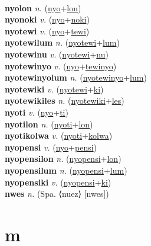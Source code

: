  \label{nyoaw} \\
\textbf{nyolon} \textit{n.} (\hyperref[nyo]{nyo}+\hyperref[lon]{lon})
 \label{nyolon} \\
\textbf{nyonoki} \textit{v.} (\hyperref[nyo]{nyo}+\hyperref[noki]{noki})
 \label{nyonoki} \\
\textbf{nyotewi} \textit{v.} (\hyperref[nyo]{nyo}+\hyperref[tewi]{tewi})
 \label{nyotewi} \\
\textbf{nyotewilum} \textit{n.} (\hyperref[nyotewi]{nyotewi}+\hyperref[lum]{lum})
 \label{nyotewilum} \\
\textbf{nyotewinu} \textit{v.} (\hyperref[nyotewi]{nyotewi}+\hyperref[nu]{nu})
 \label{nyotewinu} \\
\textbf{nyotewinyo} \textit{v.} (\hyperref[nyo]{nyo}+\hyperref[tewinyo]{tewinyo})
 \label{nyotewinyo} \\
\textbf{nyotewinyolum} \textit{n.} (\hyperref[nyotewinyo]{nyotewinyo}+\hyperref[lum]{lum})
 \label{nyotewinyolum} \\
\textbf{nyotewiki} \textit{v.} (\hyperref[nyotewi]{nyotewi}+\hyperref[ki]{ki})
 \label{nyotewiki} \\
\textbf{nyotewikiles} \textit{n.} (\hyperref[nyotewiki]{nyotewiki}+\hyperref[les]{les})
 \label{nyotewikiles} \\
\textbf{nyoti} \textit{v.} (\hyperref[nyo]{nyo}+\hyperref[ti]{ti})
 \label{nyoti} \\
\textbf{nyotilon} \textit{n.} (\hyperref[nyoti]{nyoti}+\hyperref[lon]{lon})
 \label{nyotilon} \\
\textbf{nyotikolwa} \textit{v.} (\hyperref[nyoti]{nyoti}+\hyperref[kolwa]{kolwa})
 \label{nyotikolwa} \\
\textbf{nyopensi} \textit{v.} (\hyperref[nyo]{nyo}+\hyperref[pensi]{pensi})
 \label{nyopensi} \\
\textbf{nyopensilon} \textit{n.} (\hyperref[nyopensi]{nyopensi}+\hyperref[lon]{lon})
 \label{nyopensilon} \\
\textbf{nyopensilum} \textit{n.} (\hyperref[nyopensi]{nyopensi}+\hyperref[lum]{lum})
 \label{nyopensilum} \\
\textbf{nyopensiki} \textit{v.} (\hyperref[nyopensi]{nyopensi}+\hyperref[ki]{ki})
 \label{nyopensiki} \\
\textbf{nwes} \textit{n.} (Spa. ⟨nuez⟩ [nwes])
 \label{nwes} 

\section{m}

